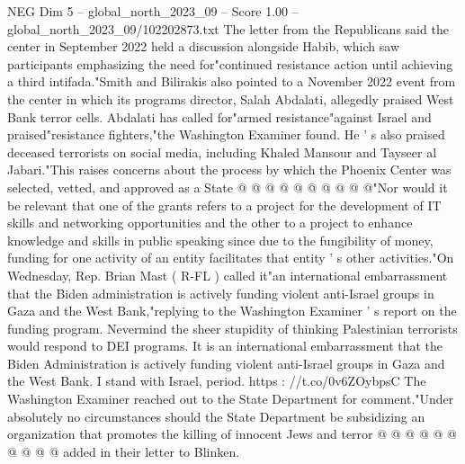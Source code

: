 \begin{textsample}{NEG Dim 5 – global\_north\_2023\_09 – Score 1.00 – global\_north\_2023\_09/102202873.txt}
The letter from the Republicans said the center in September 2022 held a discussion alongside Habib, which saw participants emphasizing the need for"continued resistance action until achieving a third intifada."Smith and Bilirakis also pointed to a November 2022 event from the center in which its programs director, Salah Abdalati, allegedly praised West Bank terror cells.
Abdalati has called for"armed resistance"against Israel and praised"resistance fighters,"the Washington Examiner found.
He ' s also praised deceased terrorists on social media, including Khaled Mansour and Tayseer al Jabari."This raises concerns about the process by which the Phoenix Center was selected, vetted, and approved as a State @ @ @ @ @ @ @ @ @ @"Nor would it be relevant that one of the grants refers to a project for the development of IT skills and networking opportunities and the other to a project to enhance knowledge and skills in public speaking since due to the fungibility of money, funding for one activity of an entity facilitates that entity ' s other activities."On Wednesday, Rep.
Brian Mast ( R-FL ) called it"an international embarrassment that the Biden administration is actively funding violent anti-Israel groups in Gaza and the West Bank,"replying to the Washington Examiner ' s report on the funding program.
Nevermind the sheer stupidity of thinking Palestinian terrorists would respond to DEI programs.
It is an international embarrassment that the Biden Administration is actively funding violent anti-Israel groups in Gaza and the West Bank.
I stand with Israel, period. https : //t.co/0v6ZOybpsC The Washington Examiner reached out to the State Department for comment."Under absolutely no circumstances should the State Department be subsidizing an organization that promotes the killing of innocent Jews and terror @ @ @ @ @ @ @ @ @ @ added in their letter to Blinken.

\end{textsample}
